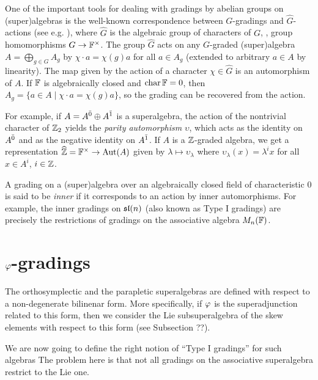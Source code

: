 \documentclass{amsbook}
\begin{document}
One of the important tools for dealing with gradings by abelian groups on (super)algebras is the well-known correspondence between  $G$-gradings and $\widehat G$-actions (see e.g. \cite[\S 1.4]{livromicha}), where $\widehat G$ is the algebraic group of characters of $G$, \ie, group homomorphisms $G \rightarrow \mathbb{F}^{\times}$. The group $\widehat{G}$ acts on any $G$-graded (super)algebra $A = \bigoplus_{g\in G} A_g$ by $\chi \cdot a = \chi(g) a$ for all $a\in A_g$ (extended to arbitrary $a\in A$ by linearity). The map given by the action of a character $\chi \in \widehat{G}$ is an automorphism of $A$. If $\mathbb{F}$ is algebraically closed and $\operatorname{char} \mathbb{F} = 0$, then $A_g = \{ a\in A \mid \chi \cdot a = \chi (g) a\}$, so the grading can be recovered from the action.

For example, if $A=A^{\bar0} \oplus A^{\bar1}$ is a superalgebra, the action of the nontrivial character of $\mathbb{Z}_2$ yields the \emph{parity automorphism} $\upsilon$, which acts as the identity on $A^{\bar0}$ and as the negative identity on $A^{\bar1}$. If $A$ is a $\mathbb{Z}$-graded algebra, we get a representation $\widehat {\mathbb{Z}} = \mathbb{F}^\times \rightarrow \operatorname{Aut} (A)$ given by $\lambda \mapsto \upsilon_\lambda$ where $\upsilon_{\lambda} (x) = \lambda^i x$ for all $x\in A^i$, $i\in \mathbb{Z}$.

A grading on a (super)algebra over an algebraically closed field of characteristic $0$ is said to be \emph{inner} if it corresponds to an action by inner automorphisms. For example, the inner gradings on $\mathfrak{sl}(n)$ (also known as Type I gradings) are precisely the restrictions of gradings on the associative algebra $M_n(\mathbb{F})$.




\chapter{$\varphi$-gradings}

The orthosymplectic and the parapletic superalgebras are defined with respect to a non-degenerate bilinenar form. More specifically, if $\varphi$ is the superadjunction related to this form, then we consider the Lie subsuperalgebra of the skew elements with respect to this form (see Subsection ??).

We are now going to define the right notion of ``Type I gradings'' for such algebras %
The problem here is that not all gradings on the associative superalgebra restrict to the Lie one.
\end{document}
